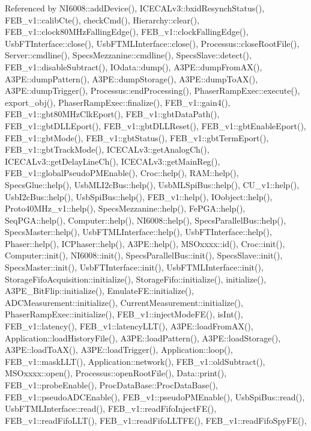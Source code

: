 Referenced by N\+I6008\+::add\+Device(), I\+C\+E\+C\+A\+Lv3\+::bxid\+Resynch\+Status(), F\+E\+B\+\_\+v1\+::calib\+Cte(), check\+Cmd(), Hierarchy\+::clear(), F\+E\+B\+\_\+v1\+::clock80\+M\+Hz\+Falling\+Edge(), F\+E\+B\+\_\+v1\+::clock\+Falling\+Edge(), Usb\+F\+T\+Interface\+::close(), Usb\+F\+T\+M\+L\+Interface\+::close(), Processus\+::close\+Root\+File(), Server\+::cmdline(), Specs\+Mezzanine\+::cmdline(), Specs\+Slave\+::detect(), F\+E\+B\+\_\+v1\+::disable\+Subtract(), I\+Odata\+::dump(), A3\+P\+E\+::dump\+From\+A\+X(), A3\+P\+E\+::dump\+Pattern(), A3\+P\+E\+::dump\+Storage(), A3\+P\+E\+::dump\+To\+A\+X(), A3\+P\+E\+::dump\+Trigger(), Processus\+::end\+Processing(), Phaser\+Ramp\+Exec\+::execute(), export\+\_\+obj(), Phaser\+Ramp\+Exec\+::finalize(), F\+E\+B\+\_\+v1\+::gain4(), F\+E\+B\+\_\+v1\+::gbt80\+M\+Hz\+Clk\+Eport(), F\+E\+B\+\_\+v1\+::gbt\+Data\+Path(), F\+E\+B\+\_\+v1\+::gbt\+D\+L\+L\+Eport(), F\+E\+B\+\_\+v1\+::gbt\+D\+L\+L\+Reset(), F\+E\+B\+\_\+v1\+::gbt\+Enable\+Eport(), F\+E\+B\+\_\+v1\+::gbt\+Mode(), F\+E\+B\+\_\+v1\+::gbt\+Status(), F\+E\+B\+\_\+v1\+::gbt\+Term\+Eport(), F\+E\+B\+\_\+v1\+::gbt\+Track\+Mode(), I\+C\+E\+C\+A\+Lv3\+::get\+Analog\+Ch(), I\+C\+E\+C\+A\+Lv3\+::get\+Delay\+Line\+Ch(), I\+C\+E\+C\+A\+Lv3\+::get\+Main\+Reg(), F\+E\+B\+\_\+v1\+::global\+Pseudo\+P\+M\+Enable(), Croc\+::help(), R\+A\+M\+::help(), Specs\+Glue\+::help(), Usb\+M\+L\+I2c\+Bus\+::help(), Usb\+M\+L\+Spi\+Bus\+::help(), C\+U\+\_\+v1\+::help(), Usb\+I2c\+Bus\+::help(), Usb\+Spi\+Bus\+::help(), F\+E\+B\+\_\+v1\+::help(), I\+Oobject\+::help(), Proto40\+M\+Hz\+\_\+v1\+::help(), Specs\+Mezzanine\+::help(), Fe\+P\+G\+A\+::help(), Seq\+P\+G\+A\+::help(), Computer\+::help(), N\+I6008\+::help(), Specs\+Parallel\+Bus\+::help(), Specs\+Master\+::help(), Usb\+F\+T\+M\+L\+Interface\+::help(), Usb\+F\+T\+Interface\+::help(), Phaser\+::help(), I\+C\+Phaser\+::help(), A3\+P\+E\+::help(), M\+S\+Oxxxx\+::id(), Croc\+::init(), Computer\+::init(), N\+I6008\+::init(), Specs\+Parallel\+Bus\+::init(), Specs\+Slave\+::init(), Specs\+Master\+::init(), Usb\+F\+T\+Interface\+::init(), Usb\+F\+T\+M\+L\+Interface\+::init(), Storage\+Fifo\+Acquisition\+::initialize(), Storage\+Fifo\+::initialize(), initialize(), A3\+P\+E\+\_\+\+Bit\+Flip\+::initialize(), Emulate\+F\+E\+::initialize(), A\+D\+C\+Measurement\+::initialize(), Current\+Measurement\+::initialize(), Phaser\+Ramp\+Exec\+::initialize(), F\+E\+B\+\_\+v1\+::inject\+Mode\+F\+E(), is\+Int(), F\+E\+B\+\_\+v1\+::latency(), F\+E\+B\+\_\+v1\+::latency\+L\+L\+T(), A3\+P\+E\+::load\+From\+A\+X(), Application\+::load\+History\+File(), A3\+P\+E\+::load\+Pattern(), A3\+P\+E\+::load\+Storage(), A3\+P\+E\+::load\+To\+A\+X(), A3\+P\+E\+::load\+Trigger(), Application\+::loop(), F\+E\+B\+\_\+v1\+::mask\+L\+L\+T(), Application\+::network(), F\+E\+B\+\_\+v1\+::old\+Subtract(), M\+S\+Oxxxx\+::open(), Processus\+::open\+Root\+File(), Data\+::print(), F\+E\+B\+\_\+v1\+::probe\+Enable(), Proc\+Data\+Base\+::\+Proc\+Data\+Base(), F\+E\+B\+\_\+v1\+::pseudo\+A\+D\+C\+Enable(), F\+E\+B\+\_\+v1\+::pseudo\+P\+M\+Enable(), Usb\+Spi\+Bus\+::read(), Usb\+F\+T\+M\+L\+Interface\+::read(), F\+E\+B\+\_\+v1\+::read\+Fifo\+Inject\+F\+E(), F\+E\+B\+\_\+v1\+::read\+Fifo\+L\+L\+T(), F\+E\+B\+\_\+v1\+::read\+Fifo\+L\+L\+T\+F\+E(), F\+E\+B\+\_\+v1\+::read\+Fifo\+Spy\+F\+E(), 